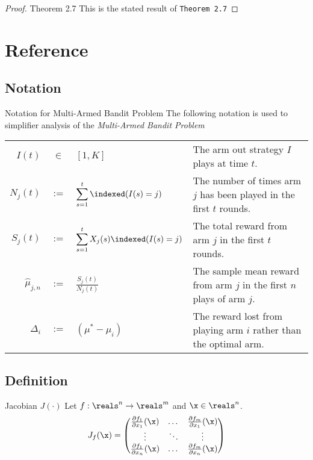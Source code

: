 \documentclass[11pt,a4paper]{article}
\begin{document}
\begin{proof}{Theorem 2.7}
    This is the stated result of \texttt{Theorem 2.7} \proved
  \end{proof}

\newpage
\setcounter{section}{-1}
\section{Reference}

\subsection{Notation}

  \begin{proposition}{Notation for Multi-Armed Bandit Problem}
    The following notation is used to simplifier analysis of the \textit{Multi-Armed Bandit Problem}
    \begin{tabular}{|rcl|l|}
      \hline
      $I(t)$&$\in$&$[1,K]$&The arm out strategy $I$ plays at time $t$.\\
      $N_j(t)$&$:=$&$\displaystyle\sum_{s=1}^t\indexed(I(s)=j)$&The number of times arm $j$ has been played in the first $t$ rounds.\\
      $S_j(t)$&$:=$&$\displaystyle\sum_{s=1}^tX_j(s)\indexed(I(s)=j)$&The total reward from arm $j$ in the first $t$ rounds.\\
      $\hat\mu_{j,n}$&$:=$&$\displaystyle\frac{S_j(t)}{N_j(t)}$&The sample mean reward from arm $j$ in the first $n$ plays of arm $j$.\\
      $\Delta_i$&$:=$&$(\mu^*-\mu_i)$ & The reward lost from playing arm $i$ rather than the optimal arm.\\
      \hline
    \end{tabular}
  \end{proposition}

\subsection{Definition}

  \begin{definition}{Jacobian $J(\cdot)$}
    Let $f:\reals^n\to\reals^m$ and $\x\in\reals^n$.
    \[ J_f(\x)=\begin{pmatrix}
      \frac{\partial f_1}{\partial x_1}(\x)&\dots&\frac{\partial f_m}{\partial x_1}(\x)\\
      \vdots&\ddots&\vdots\\
      \frac{\partial f_1}{\partial x_n}(\x)&\dots&\frac{\partial f_m}{\partial x_n}(\x)
    \end{pmatrix} \]
  \end{definition}
\end{document}
